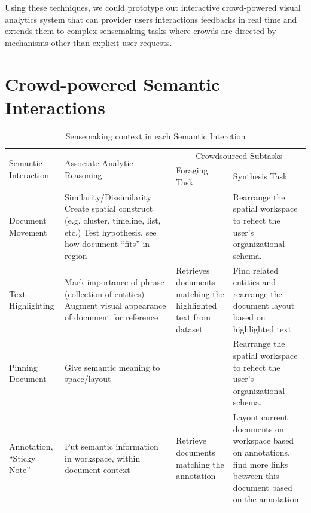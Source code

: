 \documentclass[journal]{vgtc}                %
\begin{document}
Using these techniques, we could prototype out interactive crowd-powered visual analytics system that can provider users interactions feedbacks in real time and extends them to complex sensemaking tasks where crowds are directed by mechanisms other than explicit user requests.

\section{Crowd-powered Semantic Interactions}


\begin{table}[t]
  \caption{Sensemaking context in each Semantic Interction}
  \label{tab:context}
  \centering
  \begin{tabular}{| m{2cm} | m{6cm} | m{4cm} | m{4cm} |}
  \hline
   \multirow{2}{2cm}{Semantic Interaction} & \multirow{2}{6cm}{Associate Analytic Reasoning} & \multicolumn{2}{c|}{Crowdsourced Subtasks} \\ \cline{3-4} & & Foraging Task & Synthesis Task\\ \hline

Document Movement  &  Similarity/Dissimilarity \newline Create spatial construct (e.g. cluster, timeline, list, etc.) \newline Test hypothesis, see how document “fits” in region &  & Rearrange the spatial workspace to reflect the user’s organizational schema.\\ \hline

Text Highlighting & Mark importance of phrase (collection of entities) \newline Augment visual appearance of document for reference  & Retrieves documents matching the highlighted text from dataset & Find related entities and rearrange the document layout based on highlighted text \\ \hline

Pinning Document & Give semantic meaning to space/layout &  & Rearrange the spatial workspace to reflect the user’s organizational schema.\\ \hline

Annotation, “Sticky Note” & Put semantic information in workspace, within document context & Retrieve documents matching the annotation & Layout current documents on workspace based on annotations, find more links between this document based on the annotation\\ \hline


\end{tabular}
\end{table}
\end{document}
